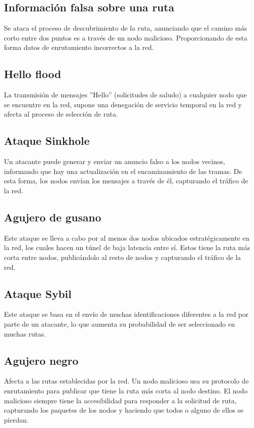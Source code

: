 \subsection{Información falsa sobre una ruta}
Se ataca el proceso de descubrimiento de la ruta, anunciando que el camino más corto entre dos puntos es a través de un nodo malicioso. Proporcionando de esta forma datos de enrutamiento incorrectos a la red.
\subsection{Hello flood}
La transmisión de mensajes ''Hello'' (solicitudes de saludo) a cualquier nodo que se encuentre en la red, supone una denegación de servicio temporal en la red y afecta al proceso de selección de ruta.
\subsection{Ataque Sinkhole}
Un atacante puede generar y enviar un anuncio falso a los nodos vecinos, informando que hay una actualización en el encaminamiento de las tramas. De esta forma, los nodos envían los mensajes a través de él, capturando el tráfico de la red.
\subsection{Agujero de gusano}
Este ataque se lleva a cabo por al menos dos nodos ubicados estratégicamente en la red, los cuales hacen un túnel de baja latencia entre sí. Estos tiene la ruta más corta entre nodos, publicándolo al resto de nodos y capturando el tráfico de la red.
\subsection{Ataque Sybil}
Este ataque se basa en el envío de muchas identificaciones diferentes a la red por parte de un atacante, lo que aumenta su probabilidad de ser seleccionado en muchas rutas.




\clearpage
\subsection{Agujero negro}
Afecta a las rutas establecidas por la red. Un nodo malicioso usa su protocolo de enrutamiento para publicar que tiene la ruta más corta al nodo destino. El nodo malicioso siempre tiene la accesibilidad para responder a la solicitud de ruta, capturando los paquetes de los nodos y haciendo que todos o alguno de ellos se pierdan.



